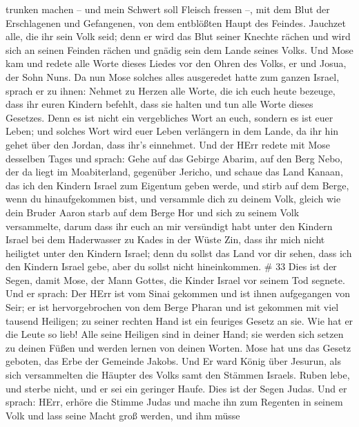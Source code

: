 trunken machen -- und mein Schwert soll Fleisch fressen --, mit dem Blut
der Erschlagenen und Gefangenen, von dem entblößten Haupt des Feindes.
 Jauchzet alle, die ihr sein Volk seid; denn er wird das
Blut seiner Knechte rächen und wird sich an seinen Feinden rächen und
gnädig sein dem Lande seines Volks.  Und Mose kam und
redete alle Worte dieses Liedes vor den Ohren des Volks, er und Josua,
der Sohn Nuns.  Da nun Mose solches alles ausgeredet hatte
zum ganzen Israel,  sprach er zu ihnen: Nehmet zu Herzen
alle Worte, die ich euch heute bezeuge, dass ihr euren Kindern befehlt,
dass sie halten und tun alle Worte dieses Gesetzes.  Denn
es ist nicht ein vergebliches Wort an euch, sondern es ist euer Leben;
und solches Wort wird euer Leben verlängern in dem Lande, da ihr hin
gehet über den Jordan, dass ihr's einnehmet.  Und der HErr
redete mit Mose desselben Tages und sprach:  Gehe auf das
Gebirge Abarim, auf den Berg Nebo, der da liegt im Moabiterland,
gegenüber Jericho, und schaue das Land Kanaan, das ich den Kindern
Israel zum Eigentum geben werde,  und stirb auf dem Berge,
wenn du hinaufgekommen bist, und versammle dich zu deinem Volk, gleich
wie dein Bruder Aaron starb auf dem Berge Hor und sich zu seinem Volk
versammelte,  darum dass ihr euch an mir versündigt habt
unter den Kindern Israel bei dem Haderwasser zu Kades in der Wüste Zin,
dass ihr mich nicht heiligtet unter den Kindern Israel; 
denn du sollst das Land vor dir sehen, dass ich den Kindern Israel gebe,
aber du sollst nicht hineinkommen. \# 33  Dies ist der
Segen, damit Mose, der Mann Gottes, die Kinder Israel vor seinem Tod
segnete.  Und er sprach: Der HErr ist vom Sinai gekommen und
ist ihnen aufgegangen von Seir; er ist hervorgebrochen von dem Berge
Pharan und ist gekommen mit viel tausend Heiligen; zu seiner rechten
Hand ist ein feuriges Gesetz an sie.  Wie hat er die Leute
so lieb! Alle seine Heiligen sind in deiner Hand; sie werden sich setzen
zu deinen Füßen und werden lernen von deinen Worten.  Mose
hat uns das Gesetz geboten, das Erbe der Gemeinde Jakobs. 
Und Er ward König über Jesurun, als sich versammelten die Häupter des
Volks samt den Stämmen Israels.  Ruben lebe, und sterbe
nicht, und er sei ein geringer Haufe.  Dies ist der Segen
Judas. Und er sprach: HErr, erhöre die Stimme Judas und mache ihn zum
Regenten in seinem Volk und lass seine Macht groß werden, und ihm müsse
